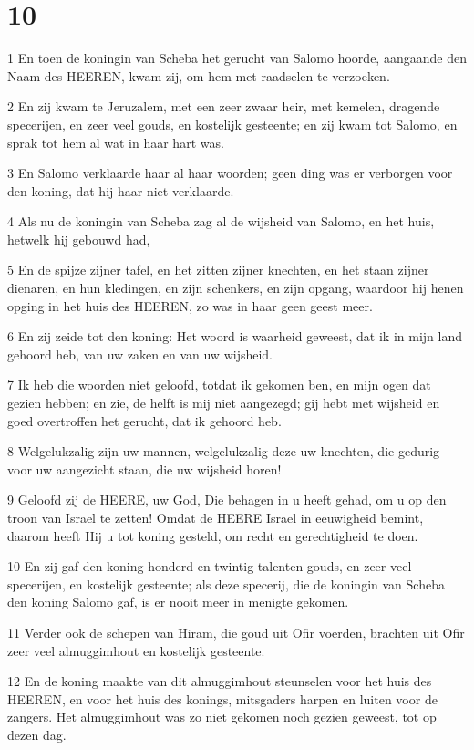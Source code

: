 \chapter{10}

\par 1 En toen de koningin van Scheba het gerucht van Salomo hoorde, aangaande den Naam des HEEREN, kwam zij, om hem met raadselen te verzoeken.
\par 2 En zij kwam te Jeruzalem, met een zeer zwaar heir, met kemelen, dragende specerijen, en zeer veel gouds, en kostelijk gesteente; en zij kwam tot Salomo, en sprak tot hem al wat in haar hart was.
\par 3 En Salomo verklaarde haar al haar woorden; geen ding was er verborgen voor den koning, dat hij haar niet verklaarde.
\par 4 Als nu de koningin van Scheba zag al de wijsheid van Salomo, en het huis, hetwelk hij gebouwd had,
\par 5 En de spijze zijner tafel, en het zitten zijner knechten, en het staan zijner dienaren, en hun kledingen, en zijn schenkers, en zijn opgang, waardoor hij henen opging in het huis des HEEREN, zo was in haar geen geest meer.
\par 6 En zij zeide tot den koning: Het woord is waarheid geweest, dat ik in mijn land gehoord heb, van uw zaken en van uw wijsheid.
\par 7 Ik heb die woorden niet geloofd, totdat ik gekomen ben, en mijn ogen dat gezien hebben; en zie, de helft is mij niet aangezegd; gij hebt met wijsheid en goed overtroffen het gerucht, dat ik gehoord heb.
\par 8 Welgelukzalig zijn uw mannen, welgelukzalig deze uw knechten, die gedurig voor uw aangezicht staan, die uw wijsheid horen!
\par 9 Geloofd zij de HEERE, uw God, Die behagen in u heeft gehad, om u op den troon van Israel te zetten! Omdat de HEERE Israel in eeuwigheid bemint, daarom heeft Hij u tot koning gesteld, om recht en gerechtigheid te doen.
\par 10 En zij gaf den koning honderd en twintig talenten gouds, en zeer veel specerijen, en kostelijk gesteente; als deze specerij, die de koningin van Scheba den koning Salomo gaf, is er nooit meer in menigte gekomen.
\par 11 Verder ook de schepen van Hiram, die goud uit Ofir voerden, brachten uit Ofir zeer veel almuggimhout en kostelijk gesteente.
\par 12 En de koning maakte van dit almuggimhout steunselen voor het huis des HEEREN, en voor het huis des konings, mitsgaders harpen en luiten voor de zangers. Het almuggimhout was zo niet gekomen noch gezien geweest, tot op dezen dag.
